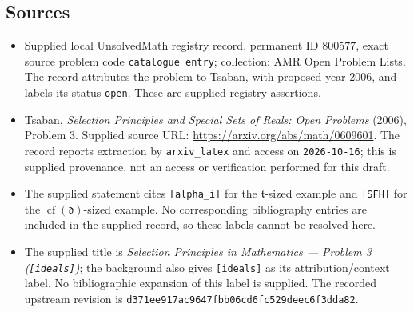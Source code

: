 \documentclass[11pt]{article}
\begin{document}
\subsection{Sources}
\begin{itemize}
\item Supplied local UnsolvedMath registry record, permanent ID \(800577\), exact source problem code \texttt{catalogue entry}; collection: AMR Open Problem Lists. The record attributes the problem to Tsaban, with proposed year 2006, and labels its status \texttt{open}. These are supplied registry assertions.
\item Tsaban, \emph{Selection Principles and Special Sets of Reals: Open Problems} (2006), Problem 3. Supplied source URL: \url{https://arxiv.org/abs/math/0609601}. The record reports extraction by \texttt{arxiv\_latex} and access on \texttt{2026-10-16}; this is supplied provenance, not an access or verification performed for this draft.
\item The supplied statement cites \texttt{[alpha\_i]} for the \(\mathfrak t\)-sized example and \texttt{[SFH]} for the \(\operatorname{cf}(\mathfrak d)\)-sized example. No corresponding bibliography entries are included in the supplied record, so these labels cannot be resolved here.
\item The supplied title is \emph{Selection Principles in Mathematics --- Problem 3 (\texttt{[ideals]})}; the background also gives \texttt{[ideals]} as its attribution/context label. No bibliographic expansion of this label is supplied. The recorded upstream revision is \texttt{d371ee917ac9647fbb06cd6fc529deec6f3dda82}.
\end{itemize}
\end{document}
